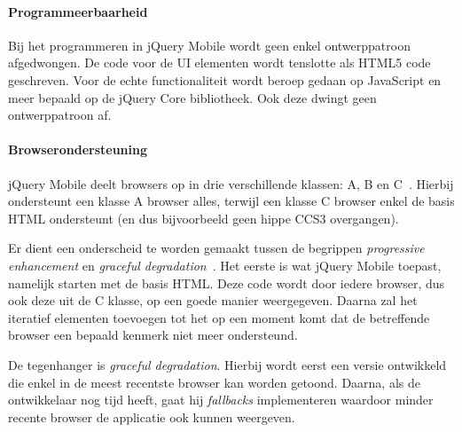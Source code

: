 \documentclass[a4paper]{article}
\newcommand{\term}[1]{\emph{#1}}
\begin{document}
\paragraph{Programmeerbaarheid}
Bij het programmeren in jQuery Mobile wordt geen enkel ontwerppatroon afgedwongen. De code voor de UI elementen wordt tenslotte als HTML5 code geschreven. Voor de echte functionaliteit wordt beroep gedaan op JavaScript en meer bepaald op de jQuery Core bibliotheek. Ook deze dwingt geen ontwerppatroon af.


\paragraph{Browserondersteuning}
\label{sec:jqm-browser-support}
jQuery Mobile deelt browsers op in drie verschillende klassen: A, B en C~\cite{JQuery2012d}. Hierbij ondersteunt een klasse A browser alles, terwijl een klasse C browser enkel de basis HTML ondersteunt (en dus bijvoorbeeld geen hippe CCS3 overgangen).
  
Er dient een onderscheid te worden gemaakt tussen de begrippen \emph{progressive enhancement} en \emph{graceful degradation}~\cite{Hens2012}. Het eerste is wat jQuery Mobile toepast, namelijk starten met de basis HTML. Deze code wordt door iedere browser, dus ook deze uit de C klasse, op een goede manier weergegeven. Daarna zal het iteratief elementen toevoegen tot het op een moment komt dat de betreffende browser een bepaald kenmerk niet meer ondersteund.  

De tegenhanger is \emph{graceful degradation}. Hierbij wordt eerst een versie ontwikkeld die enkel in de meest recentste browser kan worden getoond. Daarna, als de ontwikkelaar nog tijd heeft, gaat hij \term{fallbacks} implementeren waardoor minder recente browser de applicatie ook kunnen weergeven.
\end{document}
